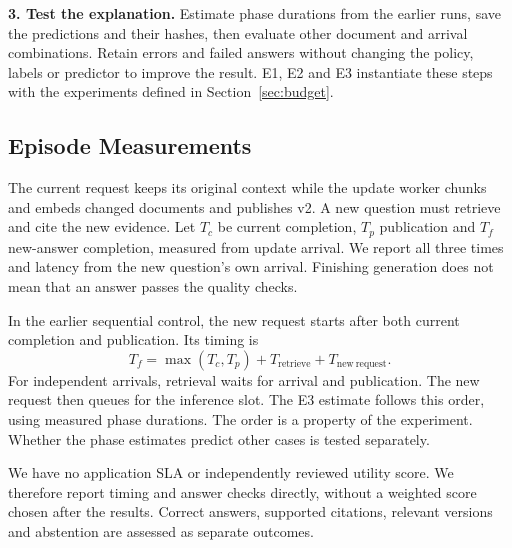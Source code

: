 \textbf{3. Test the explanation.} Estimate phase durations from the earlier
runs, save the predictions and their hashes, then evaluate other document and
arrival combinations. Retain errors and failed answers without changing the
policy, labels or predictor to improve the result. E1, E2 and E3 instantiate
these steps with the experiments defined in Section~\ref{sec:budget}.

\subsection{Episode Measurements}
The current request keeps its original context while the update worker chunks
and embeds changed documents and publishes v2. A new question must retrieve
and cite the new evidence. Let $T_c$ be current completion, $T_p$ publication
and $T_f$ new-answer completion, measured from update arrival. We report all
three times and latency from the new question's own arrival. Finishing
generation does not mean that an answer passes the quality checks.

In the earlier sequential control, the new request starts after both current
completion and publication. Its timing is
\begin{equation}
T_f=\max(T_c,T_p)+T_{\mathrm{retrieve}}+T_{\mathrm{new\ request}}.
\label{eq:critical-path}
\end{equation}
For independent arrivals, retrieval waits for arrival and publication. The new
request then queues for the inference slot. The E3 estimate follows this order,
using measured phase durations. The order is a property of the experiment.
Whether the phase estimates predict other cases is tested separately.

We have no application SLA or independently reviewed utility score. We therefore
report timing and answer checks directly, without a weighted score chosen after
the results. Correct answers, supported citations, relevant versions and
abstention are assessed as separate outcomes.


